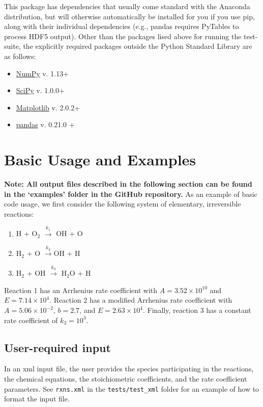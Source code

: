 \documentclass[12pt]{article}
\begin{document}
This package has dependencies that usually come standard with the Anaconda distribution, but will otherwise automatically be installed for you if you use pip, along with their individual dependencies (e.g., pandas requires PyTables to process HDF5 output). Other than the packages lised above for running the test-suite, the explicitly required packages outside the Python Standard Library are as follows: 
\begin{itemize}
\item \href{http://www.numpy.org/}{NumPy} v. 1.13+
\item \href{https://www.scipy.org/}{SciPy} v. 1.0.0+
\item \href{https://pandas.pydata.org/} {Matplotlib} v. 2.0.2+
\item \href{https://matplotlib.org/api/pyplot_api.html} {pandas} v. 0.21.0 +
\end{itemize}

\section{Basic Usage and Examples}
\textbf{Note: All output files described in the following section can be found in the `examples' folder in the GitHub repository.}
As an example of basic code usage, we first consider the following system of elementary, irreversible reactions:

\begin{enumerate}
\item H + O$_2$ $\overset{k_1}{\rightarrow}$ OH + O
\item H$_2$ + O $\overset{k_2}{\rightarrow}$OH + H
\item H$_2$ + OH $\overset{k_3}{\rightarrow}$ H$_2$O + H
\end{enumerate}

Reaction 1 has an Arrhenius rate coefficient with $A = 3.52\times 10^{10}$ and $E = 7.14\times 10^4$. Reaction 2 has a modified Arrhenius rate coefficient with $A = 5.06\times 10^{-2}$, $b = 2.7$, and $E = 2.63\times10^4$. Finally, reaction 3 has a constant rate coefficient of $k_3 = 10^3$.



\subsection{User-required input}
In an xml input file, the user provides the species participating in the reactions, the chemical equations, the stoichiometric coefficients, and the rate coefficient parameters. See {\tt rxns.xml} in the {\tt tests/test\_xml} folder for an example of how to format the input file. 
\end{document}
